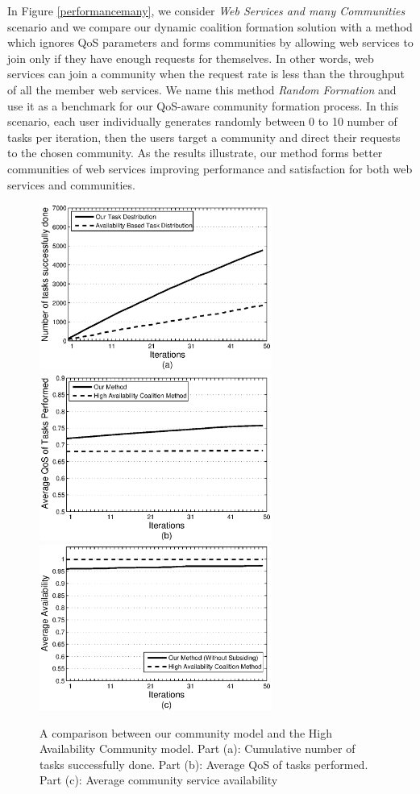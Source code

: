 \documentclass[10pt,journal,cspaper,compsoc]{IEEEtran}
\begin{document}
In Figure \ref{performancemany}, we consider \emph{Web Services
and many Communities} scenario and we compare our dynamic
coalition formation solution with a method which ignores QoS
parameters and forms communities by allowing web services to join
only if they have enough requests for themselves. In other words,
web services can join a community when the request rate is less
than the throughput of all the member web services. We name this
method \emph{Random Formation} and use it as a benchmark for our
QoS-aware community formation process. In this scenario, each user
individually generates randomly between 0 to 10 number of tasks
per iteration, then the users target a community and direct their
requests to the chosen community. As the results illustrate, our
method forms better communities of web services improving
performance and satisfaction for both web services and
communities.

\begin{figure}[!t]
\centering
\includegraphics[width=3in]{avg_task_ws_done.eps}
\includegraphics[width=3in]{avg_qos_ws_done.eps}
\includegraphics[width=3in]{avg_avail_ws_done.eps}
\caption{A comparison between our community model and the High
Availability Community model. Part (a): Cumulative number of tasks
successfully done. Part (b): Average QoS of tasks performed. Part
(c): Average community service availability}
\label{fig_avail_method}
\end{figure}
\end{document}
